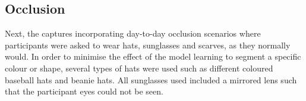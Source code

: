 \documentclass{mpaper}
\begin{document}
\subsection{Occlusion}
Next, the captures incorporating day-to-day occlusion scenarios where participants were asked to wear hats, sunglasses and scarves, as they normally would. In order to minimise the effect of the model learning to segment a specific colour or shape, several types of hats were used such as different coloured baseball hats and beanie hats. All sunglasses used included a mirrored lens such that the participant eyes could not be seen.



\begin{table}[htbp]
    \centering
    \vspace{-0.1cm}
    \vspace{0.1cm}
    \caption{Averaged accuracy and $F_{0.5}$ score for the seven fusion strategies and individual modalities against the occlusion scenarios only. Equal weighting is applied to subject and liveness predictions.}
    \label{tab:occlusion_averaged_acc_fb}
\end{table}
\end{document}
